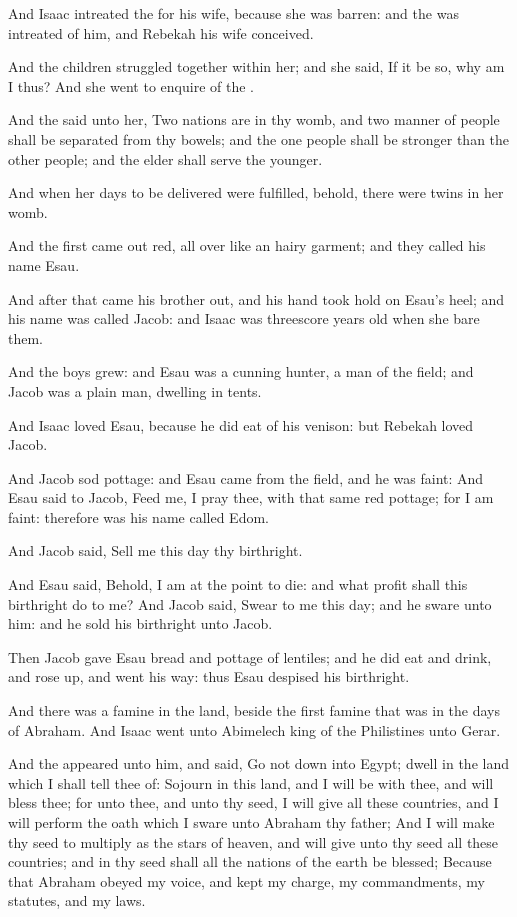 \Verse And Isaac intreated the \LORD for his wife, because she was barren: and the \LORD was intreated of him, and Rebekah his wife conceived.

\Verse And the children struggled together within her; and she said, If it be so, why am I thus? And she went to enquire of the \LORD.

\Verse And the \LORD said unto her, Two nations are in thy womb, and two manner of people shall be separated from thy bowels; and the one people shall be stronger than the other people; and the elder shall serve the younger.

\Verse And when her days to be delivered were fulfilled, behold, there were twins in her womb.

\Verse And the first came out red, all over like an hairy garment; and they called his name Esau.

\Verse And after that came his brother out, and his hand took hold on Esau's heel; and his name was called Jacob: and Isaac was threescore years old when she bare them.

\Verse And the boys grew: and Esau was a cunning hunter, a man of the field; and Jacob was a plain man, dwelling in tents.

\Verse And Isaac loved Esau, because he did eat of his venison: but Rebekah loved Jacob.

\Verse And Jacob sod pottage: and Esau came from the field, and he was faint: \Verse And Esau said to Jacob, Feed me, I pray thee, with that same red pottage; for I am faint: therefore was his name called Edom.

\Verse And Jacob said, Sell me this day thy birthright.

\Verse And Esau said, Behold, I am at the point to die: and what profit shall this birthright do to me?  \Verse And Jacob said, Swear to me this day; and he sware unto him: and he sold his birthright unto Jacob.

\Chapter
\Verse Then Jacob gave Esau bread and pottage of lentiles; and he did eat and drink, and rose up, and went his way: thus Esau despised his birthright.

\Verse And there was a famine in the land, beside the first famine that was in the days of Abraham. And Isaac went unto Abimelech king of the Philistines unto Gerar.

\Verse And the \LORD appeared unto him, and said, Go not down into Egypt; dwell in the land which I shall tell thee of: \Verse Sojourn in this land, and I will be with thee, and will bless thee; for unto thee, and unto thy seed, I will give all these countries, and I will perform the oath which I sware unto Abraham thy father; \Verse And I will make thy seed to multiply as the stars of heaven, and will give unto thy seed all these countries; and in thy seed shall all the nations of the earth be blessed; \Verse Because that Abraham obeyed my voice, and kept my charge, my commandments, my statutes, and my laws.

